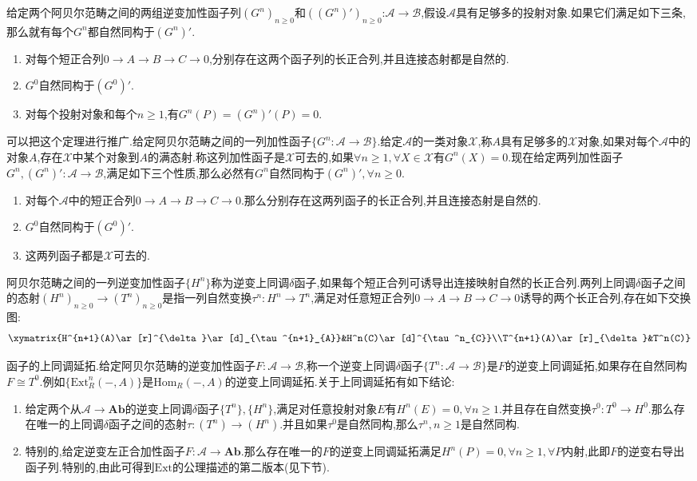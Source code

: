 给定两个阿贝尔范畴之间的两组逆变加性函子列$(G^n)_{n\ge0}$和$((G^n)')_{n\ge0}$:$\mathscr{A}\to\mathscr{B}$,假设$\mathscr{A}$具有足够多的投射对象.如果它们满足如下三条,那么就有每个$G^n$都自然同构于$(G^n)'$.
\begin{enumerate}
	\item 对每个短正合列$0\to A\to B\to C\to0$,分别存在这两个函子列的长正合列,并且连接态射都是自然的.
	\item $G^0$自然同构于$(G^0)'$.
	\item 对每个投射对象和每个$n\ge1$,有$G^n(P)=(G^n)'(P)=0$.
\end{enumerate}

可以把这个定理进行推广.给定阿贝尔范畴之间的一列加性函子$\{G^n:\mathscr{A}\to\mathscr{B}\}$.给定$\mathscr{A}$的一类对象$\mathscr{X}$,称$A$具有足够多的$\mathscr{X}$对象,如果对每个$\mathscr{A}$中的对象$A$,存在$\mathscr{X}$中某个对象到$A$的满态射.称这列加性函子是$\mathscr{X}$可去的,如果$\forall n\ge1,\forall X\in\mathscr{X}$有$G^n(X)=0$.现在给定两列加性函子$G^n,(G^n)':\mathscr{A}\to\mathscr{B}$,满足如下三个性质,那么必然有$G^n$自然同构于$(G^n)',\forall n\ge0$.
\begin{enumerate}
	\item 对每个$\mathscr{A}$中的短正合列$0\to A\to B\to C\to0$.那么分别存在这两列函子的长正合列,并且连接态射是自然的.
	\item $G^0$自然同构于$(G^0)'$.
	\item 这两列函子都是$\mathscr{X}$可去的.
\end{enumerate}

阿贝尔范畴之间的一列逆变加性函子$\{H^n\}$称为逆变上同调$\delta$函子,如果每个短正合列可诱导出连接映射自然的长正合列.两列上同调$\delta$函子之间的态射$(H^n)_{n\ge0}\to(T^n)_{n\ge0}$是指一列自然变换$\tau^n:H^n\to T^n$,满足对任意短正合列$0\to A\to B\to C\to0$诱导的两个长正合列,存在如下交换图:
$$\xymatrix{H^{n+1}(A)\ar[r]^{\delta}\ar[d]_{\tau^{n+1}_{A}}&H^n(C)\ar[d]^{\tau^n_{C}}\\T^{n+1}(A)\ar[r]_{\delta}&T^n(C)}$$

函子的上同调延拓.给定阿贝尔范畴的逆变加性函子$F:\mathscr{A}\to\mathscr{B}$,称一个逆变上同调$\delta$函子$\{T^n:\mathscr{A}\to\mathscr{B}\}$是$F$的逆变上同调延拓,如果存在自然同构$F\cong T^0$.例如$\{\mathrm{Ext}^n_R(-,A)\}$是$\mathrm{Hom}_R(-,A)$的逆变上同调延拓.关于上同调延拓有如下结论:
\begin{enumerate}
	\item 给定两个从$\mathscr{A}\to\textbf{Ab}$的逆变上同调$\delta$函子$\{T^n\},\{H^n\}$,满足对任意投射对象$E$有$H^n(E)=0,\forall n\ge1$.并且存在自然变换$\tau^0:T^0\to H^0$.那么存在唯一的上同调$\delta$函子之间的态射$\tau:(T^n)\to(H^n)$.并且如果$\tau^0$是自然同构,那么$\tau^n,n\ge1$是自然同构.
	\item 特别的,给定逆变左正合加性函子$F:\mathscr{A}\to\textbf{Ab}$.那么存在唯一的$F$的逆变上同调延拓满足$H^n(P)=0,\forall n\ge1,\forall P$内射,此即$F$的逆变右导出函子列.特别的,由此可得到$\mathrm{Ext}$的公理描述的第二版本(见下节).
\end{enumerate}
\newpage
